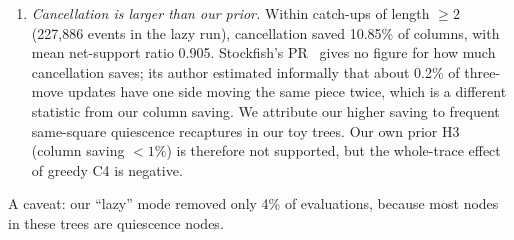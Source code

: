 \begin{enumerate}[leftmargin=*,itemsep=2pt]
\item \emph{Cancellation is larger than our prior.}
Within catch-ups of length $\ge2$ (227,886 events in the lazy run), cancellation saved 10.85\% of columns, with mean net-support ratio 0.905.
Stockfish's PR~\cite{sfpr5988} gives no figure for how much cancellation saves; its author estimated informally that about 0.2\% of three-move updates have one side moving the same piece twice, which is a different statistic from our column saving.
We attribute our higher saving to frequent same-square quiescence recaptures in our toy trees.
Our own prior H3 (column saving $<1\%$) is therefore not supported, but the whole-trace effect of greedy C4 is negative.
\end{enumerate}
A caveat: our ``lazy'' mode removed only 4\% of evaluations, because most nodes in these trees are quiescence nodes.

